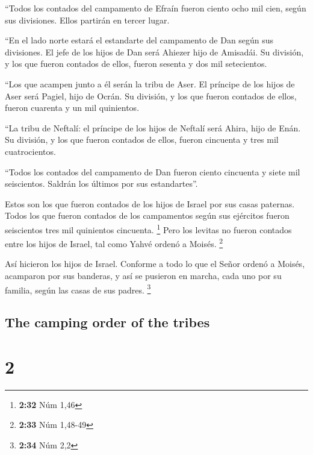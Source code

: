 \begin{paracol}{2}
 ``Todos los contados del campamento de Efraín fueron
ciento ocho mil cien, según sus divisiones. Ellos partirán en tercer
lugar.

 ``En el lado norte estará el estandarte del campamento
de Dan según sus divisiones. El jefe de los hijos de Dan será Ahiezer
hijo de Amisadái.  Su división, y los que fueron contados
de ellos, fueron sesenta y dos mil setecientos.

 ``Los que acampen junto a él serán la tribu de Aser. El
príncipe de los hijos de Aser será Pagiel, hijo de Ocrán.
 Su división, y los que fueron contados de ellos, fueron
cuarenta y un mil quinientos.

 ``La tribu de Neftalí: el príncipe de los hijos de
Neftalí será Ahira, hijo de Enán.  Su división, y los que
fueron contados de ellos, fueron cincuenta y tres mil cuatrocientos.

 ``Todos los contados del campamento de Dan fueron ciento
cincuenta y siete mil seiscientos. Saldrán los últimos por sus
estandartes''.

 Estos son los que fueron contados de los hijos de Israel
por sus casas paternas. Todos los que fueron contados de los campamentos
según sus ejércitos fueron seiscientos tres mil quinientos cincuenta.
\footnote{\textbf{2:32} Núm 1,46}  Pero los levitas no
fueron contados entre los hijos de Israel, tal como Yahvé ordenó a
Moisés. \footnote{\textbf{2:33} Núm 1,48-49}

 Así hicieron los hijos de Israel. Conforme a todo lo que
el Señor ordenó a Moisés, acamparon por sus banderas, y así se pusieron
en marcha, cada uno por su familia, según las casas de sus padres.
\footnote{\textbf{2:34} Núm 2,2}

\switchcolumn
\begin{otherlanguage}{english}

\hypertarget{the-camping-order-of-the-tribes}{%
\subsection{The camping order of the
tribes}\label{the-camping-order-of-the-tribes}}

\hypertarget{section-3}{%
\section{2}\label{section-3}}


\end{otherlanguage}
\end{paracol}
